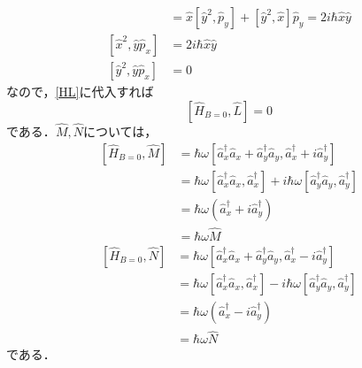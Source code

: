 \documentclass[a4paper,pdflatex,ja=standard]{bxjsarticle}
\begin{document}
\begin{enumerate}
\begin{align}
    &=
    \hat{x}\left[ \hat{y}^2,\hat{p}_{y} \right]
    +
    \left[ \hat{y}^2,\hat{x} \right]\hat{p}_{y}
    =
    2i\hbar\hat{x}\hat{y}
    \\
    \left[ \hat{x}^2,\hat{y}\hat{p}_{x} \right]
    &=
    2i\hbar\hat{x}\hat{y}
    \\
    \left[ \hat{y}^2,\hat{y}\hat{p}_{x} \right]
    &=
    0
  \end{align}
  なので，\eqref{HL}に代入すれば
  \begin{equation}
    \left[  
      \hat{H}_{B=0},\hat{L}
    \right]
    =
    0
  \end{equation}
  である．$\hat{M},\hat{N}$については，
  \begin{align}
    \left[  
      \hat{H}_{B=0},\hat{M}
    \right]
    &=
    \hbar\omega\left[  
      \hat{a}_{x}^\dagger\hat{a}_{x}+\hat{a}_{y}^\dagger\hat{a}_{y},
      \hat{a}_{x}^{\dagger}+i\hat{a}_{y}^{\dagger}
    \right]
    \nonumber
    \\
    &=
    \hbar\omega\left[  
      \hat{a}_{x}^\dagger\hat{a}_{x},
      \hat{a}_{x}^{\dagger}
    \right]
    +
    i\hbar\omega\left[  
      \hat{a}_{y}^\dagger\hat{a}_{y},\hat{a}_{y}^{\dagger}
    \right]
    \nonumber
    \\
    &=
    \hbar\omega
    \left( 
      \hat{a}_{x}^{\dagger}
      +
      i\hat{a}_{y}^\dagger
    \right)
    \nonumber
    \\
    &=
    \hbar\omega\hat{M}
    \label{com_HM}
  \end{align}
  \begin{align}
    \left[  
      \hat{H}_{B=0},\hat{N}
    \right]
    &=
    \hbar\omega\left[  
      \hat{a}_{x}^\dagger\hat{a}_{x}+\hat{a}_{y}^\dagger\hat{a}_{y},
      \hat{a}_{x}^{\dagger}-i\hat{a}_{y}^{\dagger}
    \right]
    \nonumber
    \\
    &=
    \hbar\omega\left[  
      \hat{a}_{x}^\dagger\hat{a}_{x},
      \hat{a}_{x}^{\dagger}
    \right]
    -
    i\hbar\omega\left[  
      \hat{a}_{y}^\dagger\hat{a}_{y},\hat{a}_{y}^{\dagger}
    \right]
    \nonumber
    \\
    &=
    \hbar\omega
    \left( 
      \hat{a}_{x}^{\dagger}
      -
      i\hat{a}_{y}^\dagger
    \right)
    \nonumber
    \\
    &=
    \hbar\omega\hat{N}
    \label{com_HN}
  \end{align}
  である．


\end{enumerate}
\end{document}
